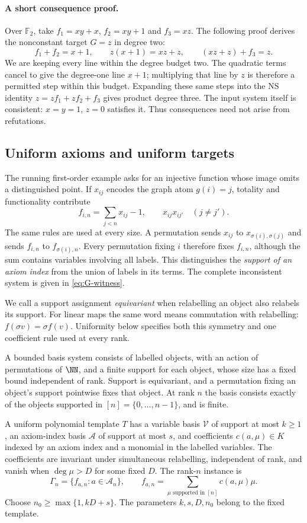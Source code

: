 \paragraph{A short consequence proof.}
Over $\mathbb F_2$, take $f_1=xy+x$, $f_2=xy+1$ and $f_3=xz$.
The following proof derives the nonconstant target $G=z$ in degree two:
\[
 f_1+f_2=x+1,\qquad z(x+1)=xz+z,\qquad (xz+z)+f_3=z.
\]
We are keeping every line within the degree budget two. The quadratic
terms cancel to give the degree-one line $x+1$; multiplying that line
by $z$ is therefore a permitted step within this budget. Expanding
these same steps into the NS identity $z=zf_1+zf_2+f_3$ gives product
degree three. The input system itself is consistent: $x=y=1$, $z=0$
satisfies it. Thus consequences need not arise from refutations.

\subsection{Uniform axioms and uniform targets}
The running first-order example asks for an injective function whose
image omits a distinguished point. If $x_{ij}$ encodes the graph atom
$g(i)=j$, totality and functionality contribute
\[
                 f_{i,n}=\sum_{j<n}x_{ij}-1,
                 \qquad x_{ij}x_{ij'}\quad(j\ne j').
\]
The same rules are used at every size. A permutation sends $x_{ij}$ to
$x_{\sigma(i),\sigma(j)}$ and sends $f_{i,n}$ to $f_{\sigma(i),n}$.
Every permutation fixing $i$ therefore fixes $f_{i,n}$, although the
sum contains variables involving all labels. This distinguishes the
\emph{support of an axiom index} from the union of labels in its terms.
The complete inconsistent system is given in \eqref{eq:G-witness}.

We call a support assignment \emph{equivariant} when relabelling an
object also relabels its support. For linear maps the same word means
commutation with relabelling: $f(\sigma v)=\sigma f(v)$. Uniformity
below specifies both this symmetry and one coefficient rule used at
every rank.

\begin{definition}\label{def:template}
A bounded basis system consists of labelled objects, with an action of
permutations of $\NN$, and a finite support for each object, whose size
has a fixed bound independent of rank. Support is
equivariant, and a permutation fixing an object's support pointwise
fixes that object. At rank $n$ the basis consists exactly of the objects
supported in $[n]=\{0,\ldots,n-1\}$, and is finite.

A uniform polynomial template $T$ has a variable basis $\mathcal V$ of
support at most $k\ge1$, an axiom-index basis $\mathcal A$ of support at
most $s$, and coefficients $c(a,\mu)\in K$ indexed by an axiom index and
a monomial in the labelled variables. The coefficients are invariant
under simultaneous relabelling, independent of rank, and vanish when
$\deg\mu>D$ for some fixed $D$. The rank-$n$ instance is
\[
 \Gamma_n=\{f_{a,n}:a\in\mathcal A_n\},\qquad
 f_{a,n}=\sum_{\mu\text{ supported in }[n]}c(a,\mu)\mu.
\]
Choose $n_0\ge\max\{1,kD+s\}$. The parameters $k,s,D,n_0$ belong to
the fixed template.
\end{definition}

